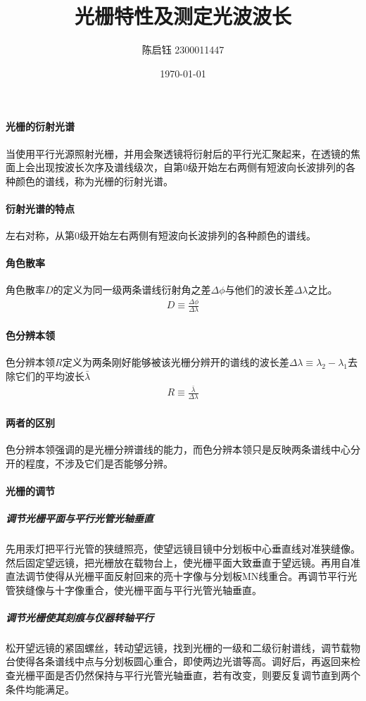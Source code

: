 \documentclass{ctexart}
\title{光栅特性及测定光波波长}
\author{陈启钰\,\,2300011447}
\date{\today}
\begin{document}
	\maketitle
	\paragraph{光栅的衍射光谱}当使用平行光源照射光栅，并用会聚透镜将衍射后的平行光汇聚起来，在透镜的焦面上会出现按波长次序及谱线级次，自第0级开始左右两侧有短波向长波排列的各种颜色的谱线，称为光栅的衍射光谱。
	\paragraph{衍射光谱的特点}左右对称，从第0级开始左右两侧有短波向长波排列的各种颜色的谱线。
	\paragraph{角色散率}角色散率$D$的定义为同一级两条谱线衍射角之差$\Delta\phi$与他们的波长差$\Delta\lambda$之比。
	\begin{align}
		D\equiv\frac{\Delta \phi}{\Delta \lambda}
	\end{align}
	\paragraph{色分辨本领}色分辨本领$R$定义为两条刚好能够被该光栅分辨开的谱线的波长差$\Delta\lambda\equiv\lambda_2-\lambda_1$去除它们的平均波长$\bar{\lambda}$
	\begin{align}
		R\equiv\frac{\bar{\lambda}}{\Delta\lambda}
	\end{align}
	\paragraph{两者的区别}色分辨本领强调的是光栅分辨谱线的能力，而色分辨本领只是反映两条谱线中心分开的程度，不涉及它们是否能够分辨。
	\paragraph{光栅的调节}
	\subparagraph{调节光栅平面与平行光管光轴垂直}先用汞灯把平行光管的狭缝照亮，使望远镜目镜中分划板中心垂直线对准狭缝像。然后固定望远镜，把光栅放在载物台上，使光栅平面大致垂直于望远镜。再用自准直法调节使得从光栅平面反射回来的亮十字像与分划板MN线重合。再调节平行光管狭缝像与十字像重合，使光栅平面与平行光管光轴垂直。
	\subparagraph{调节光栅使其刻痕与仪器转轴平行}
	松开望远镜的紧固螺丝，转动望远镜，找到光栅的一级和二级衍射谱线，调节载物台使得各条谱线中点与分划板圆心重合，即使两边光谱等高。调好后，再返回来检查光栅平面是否仍然保持与平行光管光轴垂直，若有改变，则要反复调节直到两个条件均能满足。
\end{document}
